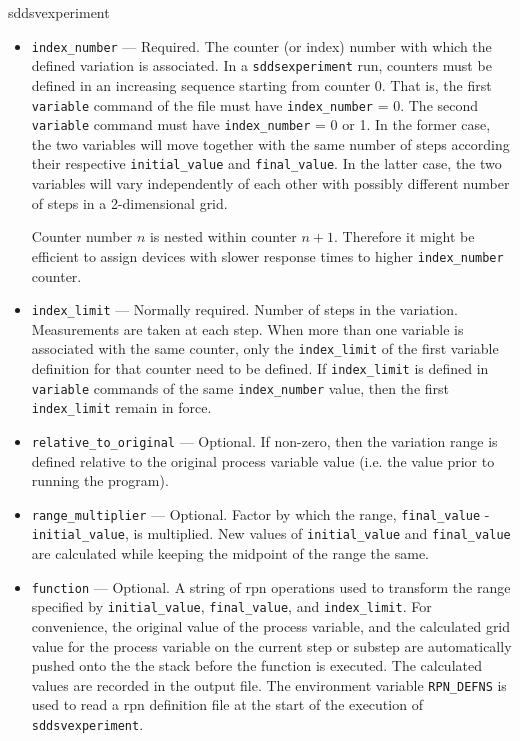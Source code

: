 \begin{sddsprog}{sddsvexperiment}
\begin{itemize}
\begin{itemize}
   \item {\verb+index_number+} --- Required. The counter (or index)
      number with which the defined variation is associated. In a
      \verb+sddsexperiment+ run, counters must be defined in an
      increasing sequence starting from counter 0. That is, the first
      {\verb+variable+} command of the file must have
      {\verb+index_number+} = 0. The second {\verb+variable+} command
      must have {\verb+index_number+} = 0 or 1. In the former case,
      the two variables will move together with the same number of
      steps according their respective {\verb+initial_value+} and
      {\verb+final_value+}. In the latter case, the two variables will
      vary independently of each other with possibly different number
      of steps in a 2-dimensional grid.

      Counter number $n$ is nested within counter $n+1$. Therefore it
      might be efficient to assign devices with slower response times
      to higher \verb+index_number+ counter.

   \item {\verb+index_limit+} --- Normally required.  Number of steps
      in the variation. Measurements are taken at each step.  When
      more than one variable is associated with the same counter, only
      the {\verb+index_limit+} of the first variable definition for
      that counter need to be defined.  If {\verb+index_limit+} is
      defined in {\verb+variable+} commands of the same
      {\verb+index_number+} value, then the first {\verb+index_limit+}
      remain in force.

   \item {\verb+relative_to_original+} --- Optional. If non-zero, then
      the variation range is defined relative to the original process
      variable value (i.e. the value prior to running the program).

   \item {\verb+range_multiplier+} --- Optional. Factor by which the
      range, {\verb+final_value+} - {\verb+initial_value+}, is
      multiplied.  New values of {\verb+initial_value+} and
      {\verb+final_value+} are calculated while keeping the midpoint
      of the range the same.

   \item {\verb+function+} --- Optional. A string of rpn operations
      used to transform the range specified by {\verb+initial_value+},
      {\verb+final_value+}, and {\verb+index_limit+}. For convenience,
      the original value of the process variable, and the calculated
      grid value for the process variable on the current step or
      substep are automatically pushed onto the the stack before the
      function is executed. The calculated values are recorded in the
      output file. The environment variable \verb+RPN_DEFNS+ is used
      to read a rpn definition file at the start of the execution of
      \verb+sddsvexperiment+.


\end{itemize}
\end{itemize}
\end{sddsprog}
